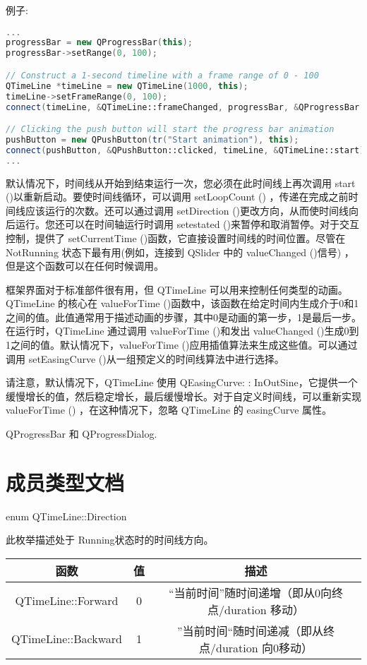 例子:

\begin{lstlisting}[language=C++]
...
progressBar = new QProgressBar(this);
progressBar->setRange(0, 100);

// Construct a 1-second timeline with a frame range of 0 - 100
QTimeLine *timeLine = new QTimeLine(1000, this);
timeLine->setFrameRange(0, 100);
connect(timeLine, &QTimeLine::frameChanged, progressBar, &QProgressBar::setValue);

// Clicking the push button will start the progress bar animation
pushButton = new QPushButton(tr("Start animation"), this);
connect(pushButton, &QPushButton::clicked, timeLine, &QTimeLine::start);
...
\end{lstlisting}

默认情况下，时间线从开始到结束运行一次，您必须在此时间线上再次调用 start ()以重新启动。要使时间线循环，可以调用 setLoopCount () ，传递在完成之前时间线应该运行的次数。还可以通过调用 setDirection ()更改方向，从而使时间线向后运行。您还可以在时间轴运行时调用 setestated ()来暂停和取消暂停。对于交互控制，提供了 setCurrentTime ()函数，它直接设置时间线的时间位置。尽管在 NotRunning 状态下最有用(例如，连接到 QSlider 中的 valueChanged ()信号) ，但是这个函数可以在任何时候调用。

框架界面对于标准部件很有用，但 QTimeLine 可以用来控制任何类型的动画。QTimeLine 的核心在 valueForTime ()函数中，该函数在给定时间内生成介于0和1之间的值。此值通常用于描述动画的步骤，其中0是动画的第一步，1是最后一步。在运行时，QTimeLine 通过调用 valueForTime ()和发出 valueChanged ()生成0到1之间的值。默认情况下，valueForTime ()应用插值算法来生成这些值。可以通过调用 setEasingCurve ()从一组预定义的时间线算法中进行选择。

请注意，默认情况下，QTimeLine 使用 QEasingCurve: : InOutSine，它提供一个缓慢增长的值，然后稳定增长，最后缓慢增长。对于自定义时间线，可以重新实现 valueForTime () ，在这种情况下，忽略 QTimeLine 的 easingCurve 属性。

\begin{seeAlso}
 QProgressBar 和 QProgressDialog.
\end{seeAlso}

\section{成员类型文档}

enum QTimeLine::Direction

此枚举描述处于 Running状态时的时间线方向。

\begin{tabular}{|c|c|c|}
\hline
函数 &	值 & 	描述 \\
\hline
QTimeLine::Forward 	&0& 	“当前时间”随时间递增（即从0向终点/duration 移动）\\
\hline
QTimeLine::Backward &	1& 	”当前时间“随时间递减（即从终点/duration 向0移动）\\
\hline
\end{tabular}

